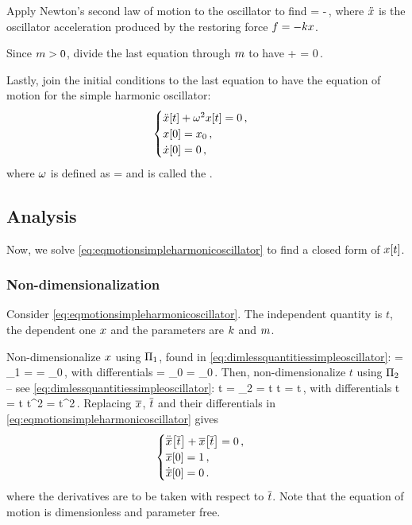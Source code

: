 Apply Newton's second law of motion to the oscillator to find
\beq
\mass\oacc = -\kspring\odisp\,,
\eeq
where $\ddot{x}$ is the oscillator acceleration produced by the restoring force $f = -kx$.

Since $m > 0$, divide the last equation through $m$ to have
\beq
\oacc + \dfrac{\kspring}{\mass}\odisp = 0\,.
\eeq

Lastly, join the initial conditions to the last equation to have the equation of motion for the simple harmonic oscillator:
\begin{equation}\label{eq:eqmotionsimpleharmonicoscillator}
  \begin{cases}
      \ddot{x}\!\left[{t}\right] + \omega^2x\!\left[{t}\right] = 0\,, \\
      x\!\left[{0}\right] = x_0\,, \\
      \dot{x}\!\left[{0}\right] = 0\,,
  \end{cases}
\end{equation}
where $\omega$ is defined as
\beq
\natfreq = \sqrt{\dfrac{\kspring}{\mass}}
\eeq
and is called the .


\subsection{Analysis}
Now, we solve \cref{eq:eqmotionsimpleharmonicoscillator} to find a closed form of $x\!\left[{t}\right]$.


\subsubsection{Non-dimensionalization}
Consider \cref{eq:eqmotionsimpleharmonicoscillator}. The independent quantity is $t$, the dependent one $x$ and the parameters are $k$ and $m$.

Non-dimensionalize $x$ using $\Pi_1$, found in \cref{eq:dimlessquantitiessimpleoscillator}:
\beq
\scpq\odisp = \kdim_1 = \implies
\odisp = \odisp_0\scpq\odisp\,,
\eeq
with differentials
\beq
   \dx\odisp = \odisp_0\dx\scpq\odisp\qquad{}\qquad
{}\odisp = \odisp_0\scpq\odisp\,.
\eeq
Then, non-dimensionalize $t$ using $\Pi_2$ -- see \cref{eq:dimlessquantitiessimpleoscillator}:
\beq
\scpq t = \kdim_2 = t\sqrt{\dfrac{\kspring}{\mass}}\implies
t = \scpq t\sqrt{\dfrac{\mass}{\kspring}}\,,
\eeq
with differentials
\beq
\dx t = \dx\scpq t\sqrt{\dfrac{\mass}{\kspring}}\qquad{}\qquad
\dx t^2 = \dx\scpq t^2\dfrac{\mass}{\kspring}\,.
\eeq
Replacing $\overline{x}$, $\overline{t}$ and their differentials in \cref{eq:eqmotionsimpleharmonicoscillator} gives
\begin{equation}\label{eq:dimlessequationmotionsimpleoscillator}
\begin{cases}
\ddot{\overline{x}}\!\left[{\overline{t}}\right] + \overline{x}\!\left[{\overline{t}}\right] = 0\,, \\
\overline{x}\!\left[{0}\right] = 1\,,\\
\dot{\overline{x}}\!\left[{0}\right] = 0\,.
\end{cases}
\end{equation}
where the derivatives are to be taken with respect to $\overline{t}$. Note that the equation of motion is dimensionless and parameter free.


